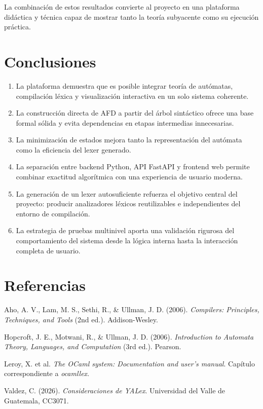 \documentclass[12pt,a4paper]{article}
\begin{document}
La combinación de estos resultados convierte al proyecto en una plataforma didáctica y técnica capaz de mostrar tanto la teoría subyacente como su ejecución práctica.

\section{Conclusiones}

\begin{enumerate}[leftmargin=2em]
  \item La plataforma demuestra que es posible integrar teoría de autómatas, compilación léxica y visualización interactiva en un solo sistema coherente.
  \item La construcción directa de AFD a partir del árbol sintáctico ofrece una base formal sólida y evita dependencias en etapas intermedias innecesarias.
  \item La minimización de estados mejora tanto la representación del autómata como la eficiencia del lexer generado.
  \item La separación entre backend Python, API FastAPI y frontend web permite combinar exactitud algorítmica con una experiencia de usuario moderna.
  \item La generación de un lexer autosuficiente refuerza el objetivo central del proyecto: producir analizadores léxicos reutilizables e independientes del entorno de compilación.
  \item La estrategia de pruebas multinivel aporta una validación rigurosa del comportamiento del sistema desde la lógica interna hasta la interacción completa de usuario.
\end{enumerate}

\section{Referencias}

\begin{enumerate}[leftmargin=2em, label={[\arabic*]}]
  \item Aho, A. V., Lam, M. S., Sethi, R., \& Ullman, J. D. (2006). \emph{Compilers: Principles, Techniques, and Tools} (2nd ed.). Addison-Wesley.
  \item Hopcroft, J. E., Motwani, R., \& Ullman, J. D. (2006). \emph{Introduction to Automata Theory, Languages, and Computation} (3rd ed.). Pearson.
  \item Leroy, X. et al. \emph{The OCaml system: Documentation and user's manual}. Capítulo correspondiente a \emph{ocamllex}.
  \item Valdez, C. (2026). \emph{Consideraciones de YALex}. Universidad del Valle de Guatemala, CC3071.
\end{enumerate}
\end{document}
